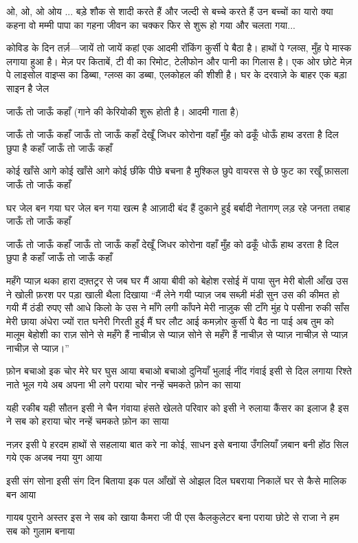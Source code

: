 ओ, ओ, ओ ओय ... 
बड़े शौक से शादी करते हैं
और जल्दी से बच्चे करते हैं
उन बच्चों का यारो क्या कहना
वो मम्मी पापा का गहना
जीवन का चक्कर फिर से शुरू हो गया और
चलता गया...

कोविड के दिन
तर्ज़—जायें तो जायें कहां
एक आदमी रॉकिंग कुर्सी पे बैठा है। हाथों पे
ग्लव्स, मुँह पे मास्क लगाया हुआ है। मेज़
पर किताबें, टी वी का रिमोट, टेलीफोन और पानी का गिलास है।
एक ओर छोटे मेज़ पे लाइसोल वाइप्स का
डिब्बा, ग्लव्स का डब्बा, एलकोहल की
शीशी है।
घर के दरवाज़े के बाहर एक बड़ा साइन है जेल

जाऊँ तो जाऊँ कहाँ
(गाने की केरियोकी शुरू होती है।
आदमी गाता है)

जाऊँ तो जाऊँ कहाँ
जाऊँ तो जाऊँ कहाँ
देखूँ जिधर कोरोना वहाँ
मुँह को ढकूँ धोऊँ हाथ
डरता है दिल छुपा है कहाँ
जाऊँ तो जाऊँ कहाँ

कोई खाँसे आगे
कोई खाँसे आगे कोई छींके पीछे
बचना है मुश्किल
छुपे वायरस से
छे फुट का रखूँ फ़ासला
जाऊँ तो जाऊँ कहाँ

घर जेल बन गया
घर जेल बन गया खत्म है आज़ादी
बंद हैं दुकाने हुई बर्बादी
नेतागण् लड़ रहे
जनता तबाह
जाऊँ तो जाऊँ कहाँ

जाऊँ तो जाऊँ कहाँ
जाऊँ तो जाऊँ कहाँ
देखूँ जिधर कोरोना वहाँ
मुँह को ढकूँ धोऊँ हाथ
डरता है दिल छुपा है कहाँ
जाऊँ तो जाऊँ कहाँ


महँगे प्याज़
थका हारा दफ़्तट्रर से जब घर मैं आया
बीवी को बेहोश रसोई में पाया
सुन मेरी बोली आँख उस ने खोली
फ़रश पर पड़ा खाली थैला दिखाया
“मैं लेने गयी प्याज़ जब सब्ज़ी मंडी
सुन उस की कीमत हो गयी मैं ठंडी
रुपए सौ आधे किलो के उस ने माँगे
लगी काँपने मेरी नाज़ुक सी टाँगे
मुंह पे पसीना रुकी साँस मेरी
छाया अंधेरा ज्यों रात घनेरी
गिरती हुई मैं घर लौट आई
कमज़ोर कुर्सी पे बैठ ना पाई
अब तुम को मालूम बेहोशी का राज़
सोने से महँगे हैं नाचीज़ से प्याज़
सोने से महँगे हैं नाचीज़ से प्याज़
नाचीज़ से प्याज़ नाचीज़ से प्याज़।”




फ़ोन
बचाओ इक चोर मेरे घर घुस आया
बचाओ बचाओ
दुनियाँ भुलाई नींद गंवाई इसी से दिल
लगाया
रिश्ते नाते भूल गये अब अपना भी लगे पराया
चोर नन्हें चमकते फ़ोन का साया
  
यही रकीब यही सौतन इसी ने चैन गंवाया
हंसते खेलते परिवार को इसी ने रुलाया
कैंसर का इलाज है इस ने सब को हराया
चोर नन्हें चमकते फ़ोन का साया

नज़र इसी पे हरदम हाथों से सहलाया
बात करे ना कोई, साधन इसे बनाया
उँगलियाँ ज़बान बनी होंठ सिल गये
एक अजब नया युग आया

इसी संग सोना इसी संग दिन बिताया
इक पल आँखों से ओझल दिल घबराया
निकालें घर से कैसे मालिक बन आया

गायब पुराने अस्तर इस ने सब को खाया
कैमरा जी पी एस कैलकुलेटर बना पराया
छोटे से राजा ने हम सब को गुलाम बनाया

